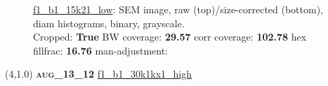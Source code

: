\begin{figure}[h!]
\label{semimg3}
\caption*{\hyperlink{covtableaug_13_12}{\color{blue} \small \ttfamily f1\_b1\_15k21\_low}: SEM image, raw (top)/size-corrected (bottom), diam histograms, binary, grayscale.\\Cropped: {\bf True} \;\; BW coverage: {\bf 29.57} \:\: corr coverage: {\bf 102.78} \:\: hex fillfrac: {\bf 16.76} \:\: man-adjustment: {\bf \color{blue}{Yes}}}
\end{figure}
\newpage

\begin{textblock}{5}(4,1.0)
{\bf \textsc{aug\_13\_12}}
\hspace{4.5cm}
\hyperlink{covtableaug_13_12}{\color{blue} \large \ttfamily f1\_b1\_30k1kx1\_high}
\end{textblock}

